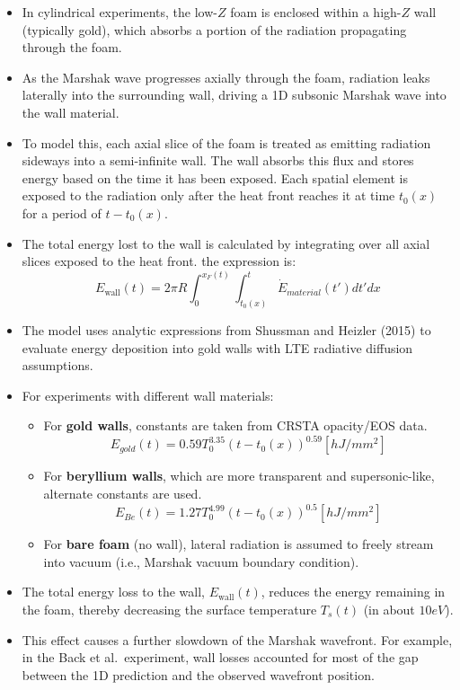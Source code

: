 \documentclass{article}
\begin{document}
\begin{itemize}
    \item In cylindrical experiments, the low-$Z$ foam is enclosed within a high-$Z$ wall (typically gold), which absorbs a portion of the radiation propagating through the foam.
    
    \item As the Marshak wave progresses axially through the foam, radiation leaks laterally into the surrounding wall, driving a 1D subsonic Marshak wave into the wall material.
    
    \item To model this, each axial slice of the foam is treated as emitting radiation sideways into a semi-infinite wall. The wall absorbs this flux and stores energy based on the time it has been exposed. Each spatial element is exposed to the radiation only after the heat front reaches it at time $t_0(x)$ for a period of $t - t_0(x)$.
    
    \item The total energy lost to the wall is calculated by integrating over all axial slices exposed to the heat front. the expression is:
    \[
    E_{\text{wall}}(t) = 2\pi R \int_0^{x_F(t)}\int_{t_0(x)}^t \dot E_{material}(t') dt'dx
    \]
    
    \item The model uses analytic expressions from Shussman and Heizler (2015) to evaluate energy deposition into gold walls with LTE radiative diffusion assumptions.
    
    \item For experiments with different wall materials:
    \begin{itemize}
        \item For \textbf{gold walls}, constants are taken from CRSTA opacity/EOS data.
        \[
                E_{gold}(t) = 0.59 T_0^{3.35}(t-t_0(x))^{0.59} [hJ/mm^2]
        \]
        \item For \textbf{beryllium walls}, which are more transparent and supersonic-like, alternate constants are used.
        \[
        E_{Be}(t) = 1.27 T_0^{4.99}(t-t_0(x))^{0.5} [hJ/mm^2]
        \]
        \item For \textbf{bare foam} (no wall), lateral radiation is assumed to freely stream into vacuum (i.e., Marshak vacuum boundary condition).
    \end{itemize}
    
    \item The total energy loss to the wall, $E_{\text{wall}}(t)$, reduces the energy remaining in the foam, thereby decreasing the surface temperature $T_s(t)$ (in about $10 eV$).
    
    \item This effect causes a further slowdown of the Marshak wavefront. For example, in the Back et al.\ experiment, wall losses accounted for most of the gap between the 1D prediction and the observed wavefront position.
\end{itemize}
\end{document}
